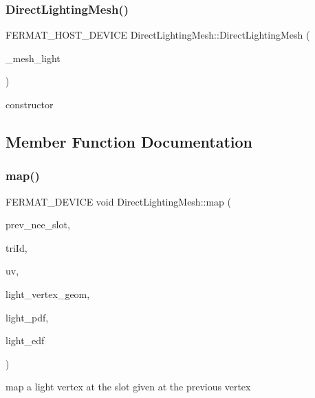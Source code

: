 \subsubsection{\texorpdfstring{Direct\+Lighting\+Mesh()}{DirectLightingMesh()}\hspace{0.1cm}{\footnotesize\ttfamily [2/2]}}
{\footnotesize\ttfamily F\+E\+R\+M\+A\+T\+\_\+\+H\+O\+S\+T\+\_\+\+D\+E\+V\+I\+CE Direct\+Lighting\+Mesh\+::\+Direct\+Lighting\+Mesh (\begin{DoxyParamCaption}\item[{const \hyperlink{struct_mesh_light}{Mesh\+Light}}]{\+\_\+mesh\+\_\+light }\end{DoxyParamCaption})\hspace{0.3cm}{\ttfamily [inline]}}

constructor 

\subsection{Member Function Documentation}
\mbox{\label{struct_direct_lighting_mesh_a2dabf1d83d06e47ee36c1290e10b0b3e}} 
\subsubsection{\texorpdfstring{map()}{map()}}
{\footnotesize\ttfamily F\+E\+R\+M\+A\+T\+\_\+\+D\+E\+V\+I\+CE void Direct\+Lighting\+Mesh\+::map (\begin{DoxyParamCaption}\item[{const uint32}]{prev\+\_\+nee\+\_\+slot,  }\item[{const uint32}]{tri\+Id,  }\item[{const \hyperlink{structcugar_1_1_vector}{cugar\+::\+Vector2f}}]{uv,  }\item[{const \hyperlink{struct_vertex_geometry}{Vertex\+Geometry}}]{light\+\_\+vertex\+\_\+geom,  }\item[{float $\ast$}]{light\+\_\+pdf,  }\item[{\hyperlink{struct_edf}{Edf} $\ast$}]{light\+\_\+edf }\end{DoxyParamCaption})\hspace{0.3cm}{\ttfamily [inline]}}

map a light vertex at the slot given at the previous vertex \mbox{\label{struct_direct_lighting_mesh_a2df01e89667068136231e0c6efd4eefc}} 

